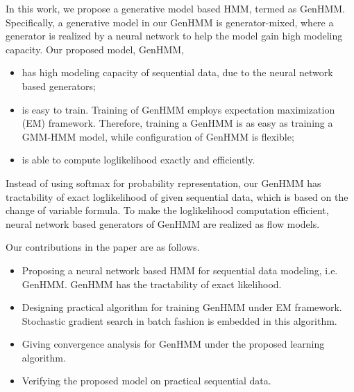 In this work, we propose a generative model based HMM, termed as GenHMM. Specifically, a generative model in our GenHMM is generator-mixed, where a generator is realized by a neural network to help the model gain high modeling capacity.
Our proposed model, GenHMM,
\begin{itemize}
\item has high modeling capacity of sequential data, due to the neural network based generators;
\item is easy to train. Training of GenHMM employs expectation maximization (EM) framework. Therefore, training a GenHMM is as easy as training a GMM-HMM model, while configuration of GenHMM is flexible;
\item is able to compute loglikelihood exactly and efficiently.
\end{itemize}
Instead of using softmax for probability representation, our GenHMM has tractability of exact loglikelihood of given sequential data, which is based on the change of variable formula. To make the loglikelihood computation efficient, neural network based generators of GenHMM are realized as flow models. 

Our contributions in the paper are as follows.
\begin{itemize}
\item Proposing a neural network based HMM for sequential data modeling, i.e. GenHMM. GenHMM has the tractability of exact likelihood.
\item Designing practical algorithm for training GenHMM under EM framework. Stochastic gradient  search in batch fashion is embedded in this algorithm.
\item Giving convergence analysis for GenHMM under the proposed learning algorithm.
\item Verifying the proposed model on practical sequential data.
\end{itemize}








